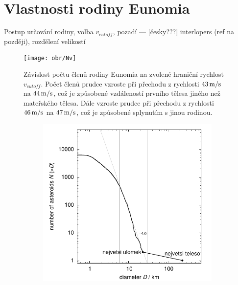 \documentclass[A4paper, 12pt, oneside]{book}
\begin{document}
\chapter{Vlastnosti rodiny Eunomia}
Postup určování rodiny, volba $v_{cutoff}$, pozadí --- [česky???] interlopers (ref na později), rozdělení velikostí 
\begin{figure}[!htb]
	\centering
	\texttt{[image: obr/Nv]}
	\caption{Závislost počtu členů rodiny Eunomia na zvolené hraniční rychlost $v_{cutoff}$. Počet členů prudce vzroste při přechodu z rychlosti $43\,{\rm m/s}$ na $44\,{\rm m/s}$, což je způsobené vzdáleností prvního tělesa jiného než mateřského tělesa. Dále vzroste prudce při přechodu z rychlosti $46\,{\rm m/s}$ na $47\,{\rm m/s}$, což je způsobené splynutím s jinou rodinou.}
	\label{Nv}
\end{figure}
\begin{figure}[!htb]
	\centering
	\begin{subfigure}[b]{0.45\textwidth}
	\includegraphics[width=\textwidth]{obr/size_distribution}
	\end{subfigure}
	\begin{subfigure}[b]{0.45\textwidth}

\end{subfigure}
\end{figure}
\end{document}
